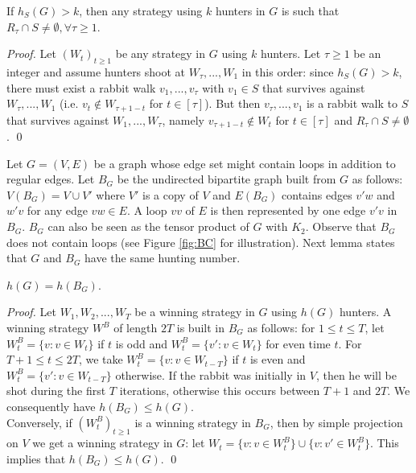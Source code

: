 \documentclass[runningheads]{llncs}
\begin{document}
\begin{lemma}\label{nodeconaminationS}
If $h_S(G) > k$, then any strategy using $k$ %
{hunters} in $G$ is such that $R_{\tau} \cap S \neq \emptyset, \forall \tau \geq 1$.
\end{lemma}
\begin{proof}
Let  $(W_t)_{t \geq 1}$ be any strategy in $G$ using $k$ {hunters}. 
Let $\tau \geq 1$ be an integer and assume hunters shoot at $W_{\tau},...,W_1$ in this order: since $h_S(G) > k$, there must exist a rabbit walk $v_1,...,v_{\tau}$ with $v_1\in S$ that survives against $W_{\tau},...,W_1$ (i.e. $v_t\notin W_{\tau+1-t}$ for $t \in [\tau]$). But then $v_{\tau},...,v_1$ is a rabbit walk to $S$ that survives against $W_1,...,W_{\tau}$, namely  $v_{\tau+1-t}\notin W_t$ for $t \in [\tau]$ and $R_{\tau} \cap S \neq \emptyset$.%
\qed
\end{proof}


Let $G = (V,E)$ be a graph whose edge set might contain loops in addition to regular edges.   Let $B_G$ be the undirected  bipartite graph built from $G$ as follows: $V(B_G) = V \cup V'$ where $V'$ is a copy of $V$ and $E(B_G)$ contains edges $v'w$ and $w'v$ for any edge  $v w \in E$. A loop  $v v$ of  $E$ is then represented by one edge $v'v$ in $B_G$. $B_G$ can also be seen as the tensor product of $G$ with $K_2$. 
Observe that $B_G$ does not contain loops (see Figure \ref{fig:BC} for illustration). Next lemma states that $G$ and $B_G$ have the same hunting number. 

\begin{lemma}
$h(G) = h(B_G)$.
\label{lem:bipartite}
\end{lemma}
\begin{proof}
Let $W_1, W_2,..., W_T$ be a winning strategy in  $G$ using $h(G)$ hunters. A winning strategy $W^B$ of length $2T$ is built in $B_G$ as follows: for $1 \leq t \leq T$, let $W^B_t = \{v: v \in W_t \}$ if $t$ is odd and  $W^B_t = \{v': v \in W_t\}$ for even time $t$. For $T+1 \leq t \leq 2T$, we take $W^B_t = \{v: v \in W_{t-T}\}$ if $t$ is even and  $W^B_t = \{v': v \in W_{t-T}\}$ otherwise. If the rabbit was initially in $V$, then he will be shot during the first $T$ iterations, otherwise  this occurs between $T+1$ and $2T$. We consequently have $h(B_G) \leq h(G)$.\\
Conversely, if $(W^B_t)_{t \geq 1} $ is a winning strategy in $B_G$, then by simple projection on $V$ we get a winning strategy in $G$: let $W_t = \{v: v \in W^B_t\} \cup \{v: v' \in W^B_t\}$. This implies that $h(B_G) \leq h(G)$.
\qed\end{proof}
\end{document}
